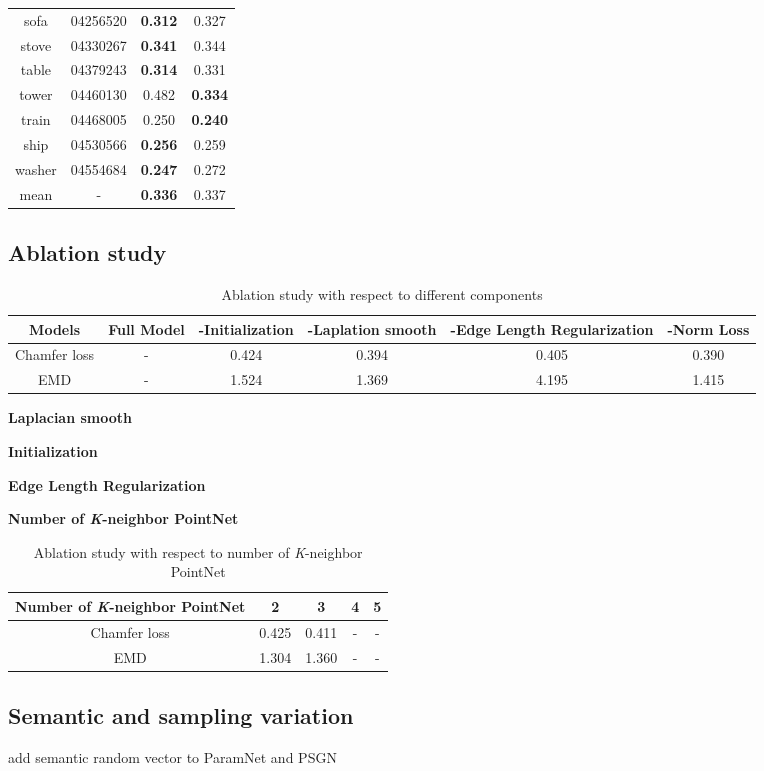 \begin{table}
\begin{tabular}{c c c c}
		sofa & 04256520 & {\color{blue}\textbf{0.312}} & 0.327\\
		stove & 04330267 & {\color{blue}\textbf{0.341}} & 0.344\\
		table & 04379243 & {\color{blue}\textbf{0.314}} & 0.331\\
		tower & 04460130 & 0.482 & {\color{blue}\textbf{0.334}}\\
		train & 04468005 & 0.250 & {\color{blue}\textbf{0.240}}\\
		ship  & 04530566 & {\color{blue}\textbf{0.256}} & 0.259\\
		washer &  04554684 & {\color{blue}\textbf{0.247}} & 0.272\\
		mean   &     -     & {\color{blue}\textbf{0.336}} & 0.337
	\end{tabular}
\end{table}

\subsection{Ablation study}
\begin{table*}
	\caption{Ablation study with respect to different components}
	\label{tab:ablation}
	\centering
	\begin{tabular}{c | c c c c c}
		Models &  Full Model  & -Initialization & -Laplation smooth & -Edge Length Regularization & -Norm Loss \\
		\hline
		Chamfer loss & - & 0.424 & 0.394 & 0.405  & 0.390\\
		EMD			 & - & 1.524 & 1.369 & 4.195  & 1.415
	\end{tabular}
\end{table*}
\noindent\textbf{Laplacian smooth}

\noindent\textbf{Initialization}

\noindent\textbf{Edge Length Regularization}

\noindent\textbf{Number of \textit{K}-neighbor PointNet}
\begin{table*}
	\caption{Ablation study with respect to number of \textit{K}-neighbor PointNet}
	\label{tab:pointnet}
	\centering
	\begin{tabular}{c | c c c c}
		Number of \textit{K}-neighbor PointNet &  2 & 3 & 4 & 5 \\
		\hline
		Chamfer loss & 0.425 &  0.411 & - & - \\
		EMD			&  1.304 & 1.360 & - & -
	\end{tabular}
\end{table*}
\subsection{Semantic and sampling variation}
add semantic random vector to ParamNet and PSGN\cite{PSGN}